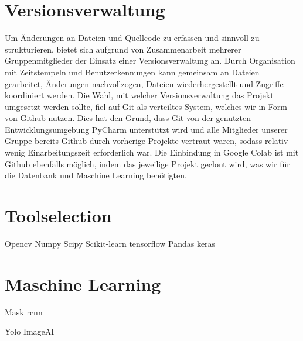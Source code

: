 \section{Versionsverwaltung}
Um Änderungen an Dateien und Quellcode zu erfassen und sinnvoll zu strukturieren, bietet sich aufgrund von Zusammenarbeit mehrerer Gruppenmitglieder der Einsatz einer Versionsverwaltung an. Durch Organisation mit Zeitstempeln und Benutzerkennungen kann gemeinsam an Dateien gearbeitet, Änderungen nachvollzogen, Dateien wiederhergestellt und Zugriffe koordiniert werden. Die Wahl, mit welcher Versionsverwaltung das Projekt umgesetzt werden sollte, fiel auf Git als verteiltes System, welches wir in Form von Github nutzen. Dies hat den Grund, dass Git von der genutzten Entwicklungsumgebung PyCharm unterstützt wird und alle Mitglieder unserer Gruppe bereits Github durch vorherige Projekte vertraut waren, sodass relativ wenig Einarbeitungszeit erforderlich war. Die Einbindung in Google Colab ist mit Github ebenfalls möglich, indem das jeweilige Projekt geclont wird, was wir für die Datenbank und Maschine Learning benötigten.
\section{Toolselection}
	Opencv
	Numpy
	Scipy
	Scikit-learn
	tensorflow
	Pandas
	keras
	
	
\section{Maschine Learning}


Mask rcnn

Yolo
ImageAI

